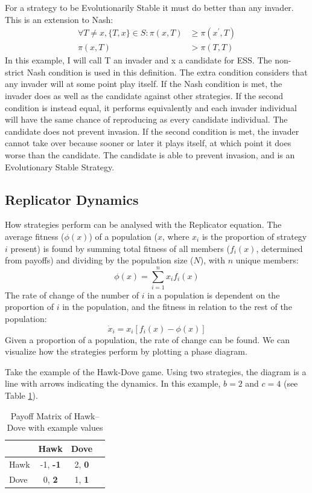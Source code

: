 \documentclass[a4paper,11pt,bcshonoursthesis,singlespace,twoside,thesisdraft,pdflatex]{cssethesis}
\begin{document}
For a strategy to be Evolutionarily Stable it must do better than any invader. 
This is an extension to Nash:
\begin{align*}
\forall T \neq x, \{T,x\} \in S: \pi(x,T)&\geq \pi(x^\prime,T) \\ 
\pi(x, T) &> \pi(T,T)
\end{align*}
In this example, I will call T an invader and x a candidate for ESS. 
The non-strict Nash condition is used in this definition. 
The extra condition considers that any invader will at some point play itself. 
If the Nash condition is met, the invader does as well as the candidate against other strategies. 
If the second condition is instead equal, it performs equivalently and each invader individual will have the same chance of reproducing as every candidate individual. 
The candidate does not prevent invasion. 
If the second condition is met, the invader cannot take over because sooner or later it plays itself, at which point it does worse than the candidate. 
The candidate is able to prevent invasion, and is an Evolutionary Stable Strategy. 


\subsection{Replicator Dynamics}
How strategies perform can be analysed with the Replicator equation. 
The average fitness ($\phi(x)$) of a population ($x$, where $x_i$ is the proportion of strategy $i$ present) is found by summing total fitness of all members ($f_i(x)$, determined from payoffs) and dividing by the population size ($N$), with $n$ unique members:
\begin{equation}
\phi(x)=\sum_{i=1}^n x_i f_i(x)
\end{equation}
The rate of change of the number of $i$ in a population is dependent on the proportion of $i$ in the population, and the fitness in relation to the rest of the population:
\begin{equation}
\dot{x}_i=x_i [ f_i(x)-\phi(x)]
\end{equation}
Given a proportion of a population, the rate of change can be found. 
We can visualize how the strategies perform by plotting a phase diagram.  

Take the example of the Hawk-Dove game. Using two strategies, the diagram is a line with arrows indicating the dynamics. In this example, $b=2$ and $c=4$ (see Table \ref{table:hawkdove50}).

\begin{table}[h]\centering
\captionsetup{justification=centering}
\begin{tabular}{|l|c|c|c|}
\hline
 & \bf{Hawk} & \bf{Dove}\\
\hline
Hawk & -1, \bf{-1} & 2, \bf{0}\\
\hline
Dove & 0, \bf{2}  & 1, \bf{1} \\
\hline
\end{tabular}
\caption{Payoff Matrix of Hawk--Dove with example values}
\label{table:hawkdove50}
\end{table}
\end{document}
